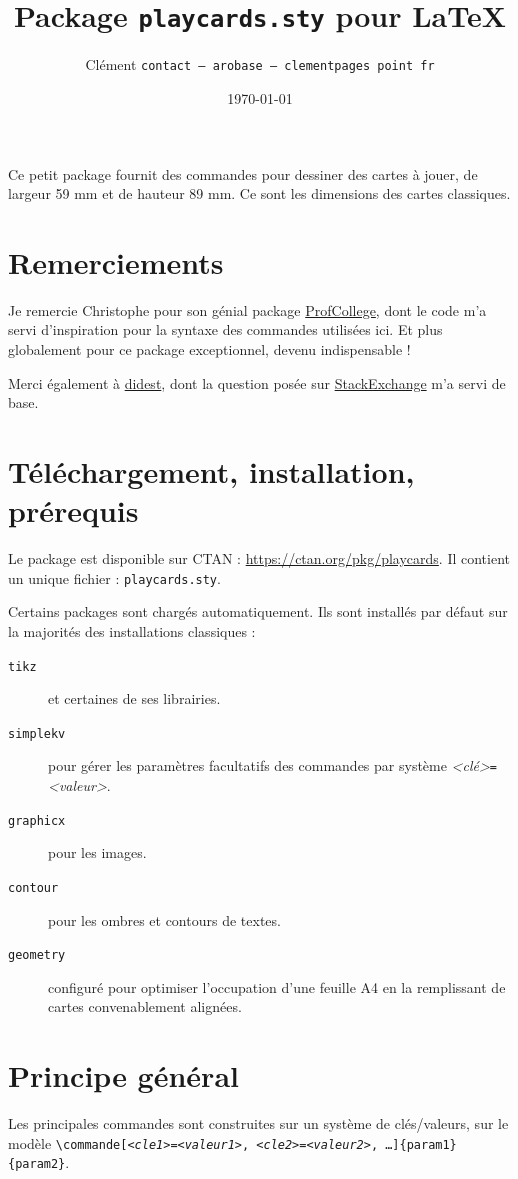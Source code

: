 \documentclass[a4paper, 12pt]{article}
\title{Package \texttt{playcards.sty} pour \LaTeX}
\date{\today}
\author{Clément \bsc{Pagès} \texttt{contact -- arobase -- clementpages point fr}}
\newcommand{\package}[1]{\texttt{#1}}
\newcommand{\kv}[2]{\textit{<#1>}\texttt=\textit{<#2>}}
\begin{document}
\maketitle

Ce petit package fournit des commandes pour dessiner des cartes à jouer, de largeur 59 mm et de hauteur 89 mm. Ce sont les dimensions des cartes classiques.

\tableofcontents

\section*{Remerciements}
Je remercie Christophe  pour son génial package \href{https://ctan.org/pkg/profcollege}{ProfCollege}, dont le code m'a servi d'inspiration pour la syntaxe des commandes utilisées ici. Et plus globalement pour ce package exceptionnel, devenu indispensable !

Merci également à \href{https://tex.stackexchange.com/users/1948/didest}{didest}, dont la question posée sur \href{https://tex.stackexchange.com/questions/47924/creating-playing-cards-using-tikz}{StackExchange} m'a servi de base.

\section{Téléchargement, installation, prérequis}
Le package est disponible sur CTAN : \href{https://ctan.org/pkg/playcards}{https://ctan.org/pkg/playcards}. Il contient un unique fichier : \texttt{playcards.sty}.

Certains packages sont chargés automatiquement. Ils sont installés par défaut sur la majorités des installations classiques :
\begin{description}
	\item[\package{tikz}] et certaines de ses librairies.
	\item[\package{simplekv}] pour gérer les paramètres facultatifs des commandes par système \kv{clé}{valeur}.
	\item[\package{graphicx}] pour les images. 
	\item[\package{contour}] pour les ombres et contours de textes.
	\item[\package{geometry}] configuré pour optimiser l'occupation d'une feuille A4 en la remplissant de cartes convenablement alignées.
\end{description}

\section{Principe général}
Les principales commandes sont construites sur un système de clés/valeurs, sur le modèle \texttt{\textbackslash commande[\kv{cle1}{valeur1}, \kv{cle2}{valeur2}, …]\{param1\}\{param2\}}.
\end{document}
